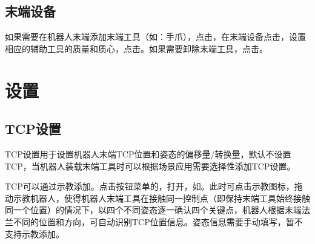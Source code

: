 \subsection{末端设备}
\label{sec:末端设备}
如果需要在机器人末端添加末端工具（如：手爪），点击，在末端设备点击，设置相应的辅助工具的质量和质心，点击。如果需要卸除末端工具，点击。


\section{设置}
\subsection{TCP设置}
TCP设置用于设置机器人末端TCP位置和姿态的偏移量/转换量，默认不设置TCP，当机器人装载末端工具时可以根据场景应用需要选择性添加TCP设置。

TCP可以通过示教添加。点击按钮菜单的，打开，如。此时可点击示教图标，拖动示教机器人，使得机器人末端工具在接触同一控制点（即保持末端工具始终接触同一个位置）的情况下，以四个不同姿态逐一确认四个关键点，机器人根据末端法兰不同的位置和方向，可自动识别TCP位置信息。姿态信息需要手动填写，暂不支持示教添加。

